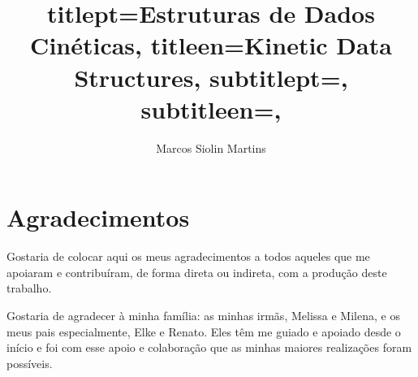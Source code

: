 \documentclass[12pt,twoside,english,brazilian]{book}
\title{
    titlept={Estruturas de Dados Cinéticas},
    titleen={Kinetic Data Structures},
    subtitlept={},
    subtitleen={},
}
\author{Marcos Siolin Martins}
\begin{document}

    \frontmatter

    \pagestyle{plain}

    \onehalfspacing %

    \maketitle %




    \chapter*{Agradecimentos}

    Gostaria de colocar aqui os meus agradecimentos a todos aqueles que
    me apoiaram e contribuíram, de forma direta ou indireta, com a
    produção deste trabalho.

    Gostaria de agradecer à minha família: as minhas irmãs, Melissa e
    Milena, e os meus pais especialmente, Elke e Renato. Eles têm me
    guiado e apoiado desde o início e foi com esse apoio e colaboração
    que as minhas maiores realizações foram possíveis.
\end{document}
